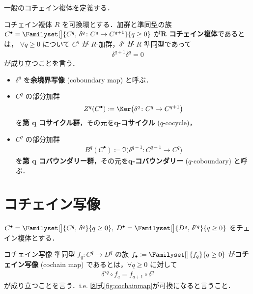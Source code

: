 \documentclass[algtopo_main]{subfiles}
\begin{document}
一般のコチェイン複体を定義する．

\begin{mydef}[label=def:CCC]{コチェイン複体}
    $R$ を可換環とする．加群と準同型の族 $C^\bullet = \Familyset[\big]{C^q,\,\delta^q \colon C^q \to C^{q+1}}{q \ge 0}$ が\textbf{$\bm{R}$ コチェイン複体}であるとは，
    $\forall q \ge 0$ について $C^q$ が $R$-加群，$\delta^q$ が $R$ 準同型であって
    \begin{align}
        \delta^{q+1} \delta^q = 0
    \end{align}
    が成り立つことを言う．
\end{mydef}

\begin{itemize}
    \item $\delta^q$ を\textbf{余境界写像} (coboundary map) と呼ぶ．
    \item $C^q$ の部分加群
    \begin{align}
        Z^q(C^\bullet) \coloneqq \Ker \bigl( \delta^q \colon C^q \to C^{q+1} \bigr) 
    \end{align}
    を\textbf{第 $\bm{q}$ コサイクル群}，その元を\textbf{$\bm{q}$-コサイクル} ($q$-cocycle)，
    \item $C^q$ の部分加群
    \begin{align}
        B^q(C^\bullet) \coloneqq \Im \bigl( \delta^{q-1} \colon C^{q-1} \to C^q \bigr) 
    \end{align}
    を\textbf{第 $\bm{q}$ コバウンダリー群}，その元を\textbf{$\bm{q}$-コバウンダリー} ($q$-coboundary) と呼ぶ．
\end{itemize}

\section{コチェイン写像}

$C^\bullet = \Familyset[\big]{C^q,\, \delta^q}{q \ge 0},\;D^\bullet = \Familyset[\big]{D^q,\, \delta'{}^q}{q \ge 0}$ をチェイン複体とする．

\begin{mydef}[label=def:cochainmap]{コチェイン写像}
    準同型 $f_q \colon C^q \to D^q$ の族 $f_\bullet \coloneqq \Familyset[\big]{f_q}{q\ge 0}$ が\textbf{コチェイン写像} (cochain map) であるとは，$\forall q \ge 0$ に対して
    \begin{align}
        \delta'{}^q \circ f_q = f_{q+1} \circ \delta^q
    \end{align}
    が成り立つことを言う．i.e. 図式\ref{fig:cochainmap}が可換になると言うこと．
\end{mydef}
\end{document}
